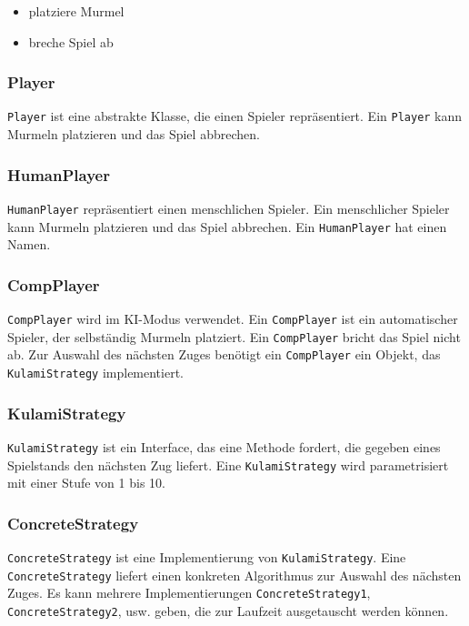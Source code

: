 \documentclass{scrartcl}
\begin{document}
\begin{itemize}
\item platziere Murmel
\item breche Spiel ab
\end{itemize}

\subsubsection{Player}
\label{sec:Player}

\texttt{Player} ist eine abstrakte Klasse, die einen Spieler repräsentiert. Ein \texttt{Player} kann Murmeln platzieren und das Spiel abbrechen.

\subsubsection{HumanPlayer}
\label{sec:HumanPlayer}

\texttt{HumanPlayer} repräsentiert einen menschlichen Spieler. Ein menschlicher Spieler kann Murmeln platzieren und das Spiel abbrechen.  Ein \texttt{HumanPlayer} hat einen Namen.

\subsubsection{CompPlayer}
\label{sec:CompPlayer}

\texttt{CompPlayer} wird im KI-Modus verwendet.  Ein \texttt{CompPlayer} ist ein automatischer Spieler, der selbständig Murmeln platziert.  Ein \texttt{CompPlayer} bricht das Spiel nicht ab.  Zur Auswahl des nächsten Zuges benötigt ein \texttt{CompPlayer} ein Objekt, das \texttt{KulamiStrategy} implementiert.

\subsubsection{KulamiStrategy}
\label{sec:KulamiStrategy}

\texttt{KulamiStrategy} ist ein Interface, das eine Methode fordert, die gegeben eines Spielstands den nächsten Zug liefert.  Eine \texttt{KulamiStrategy} wird parametrisiert mit einer Stufe von 1 bis 10.

\subsubsection{ConcreteStrategy}
\label{sec:ConcreteStrategy}

\texttt{ConcreteStrategy} ist eine Implementierung von \texttt{KulamiStrategy}.  Eine \texttt{ConcreteStrategy} liefert einen konkreten Algorithmus zur Auswahl des nächsten Zuges.  Es kann mehrere Implementierungen \texttt{ConcreteStrategy1}, \texttt{ConcreteStrategy2}, usw. geben, die zur Laufzeit ausgetauscht werden können.
\end{document}
